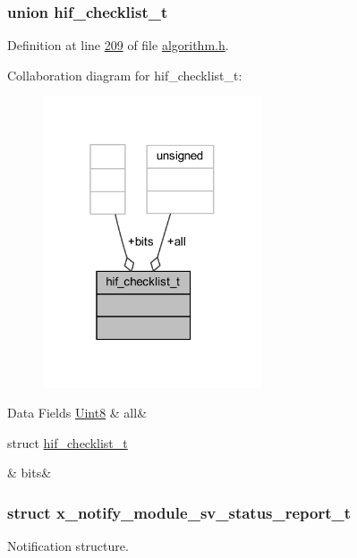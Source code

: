 \label{d7/d9f/a00454}
\hypertarget{a00021_d7/d9f/a00454}{}
\subsubsection{union hif\+\_\+checklist\+\_\+t}


Definition at line \hyperlink{a00021_source_l00209}{209} of file \hyperlink{a00021_source}{algorithm.\+h}.



Collaboration diagram for hif\+\_\+checklist\+\_\+t\+:\nopagebreak
\begin{figure}[H]
\begin{center}
\leavevmode
\includegraphics[width=184pt]{d2/da1/a00879}
\end{center}
\end{figure}
\begin{DoxyFields}{Data Fields}
\hypertarget{a00021_a2625a533c46821f49caaf4dcc77316b1}{\hyperlink{a00072_af84840501dec18061d18a68c162a8fa2}{Uint8}}\label{a00021_a2625a533c46821f49caaf4dcc77316b1}
&
all&
\\
\hline

\hypertarget{a00021_a4c757443cba2deaf7051fd53f385a73e}{struct \hyperlink{a00021_dd/d63/a00455}{hif\+\_\+checklist\+\_\+t}}\label{a00021_a4c757443cba2deaf7051fd53f385a73e}
&
bits&
\\
\hline

\end{DoxyFields}
\label{d7/d1b/a00864}
\hypertarget{a00021_d7/d1b/a00864}{}
\subsubsection{struct x\+\_\+notify\+\_\+module\+\_\+sv\+\_\+status\+\_\+report\+\_\+t}
Notification structure. 

